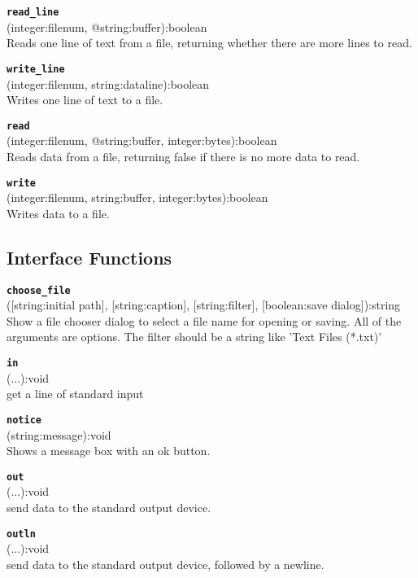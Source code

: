 \documentclass{article}
\begin{document}
{\large \texttt{\textbf{read\_line}}}\\
\textsf{ (integer:filenum, @string:buffer):boolean }\\
Reads one line of text from a file, returning whether there are more lines to read.

{\large \texttt{\textbf{write\_line}}}\\
\textsf{ (integer:filenum, string:dataline):boolean }\\
Writes one line of text to a file.

{\large \texttt{\textbf{read}}}\\
\textsf{ (integer:filenum, @string:buffer, integer:bytes):boolean }\\
Reads data from a file, returning false if there is no more data to read.

{\large \texttt{\textbf{write}}}\\
\textsf{ (integer:filenum, string:buffer, integer:bytes):boolean }\\
Writes data to a file.


\subsection{Interface Functions}
{\large \texttt{\textbf{choose\_file}}}\\
\textsf{ ([string:initial path], [string:caption], [string:filter], [boolean:save dialog]):string }\\
Show a file chooser dialog to select a file name for opening or saving. All of the arguments are options.  The filter should be a string like 'Text Files (*.txt)'

{\large \texttt{\textbf{in}}}\\
\textsf{ (...):void }\\
get a line of standard input

{\large \texttt{\textbf{notice}}}\\
\textsf{ (string:message):void }\\
Shows a message box with an ok button.

{\large \texttt{\textbf{out}}}\\
\textsf{ (...):void }\\
send data to the standard output device.

{\large \texttt{\textbf{outln}}}\\
\textsf{ (...):void }\\
send data to the standard output device, followed by a newline.
\end{document}
